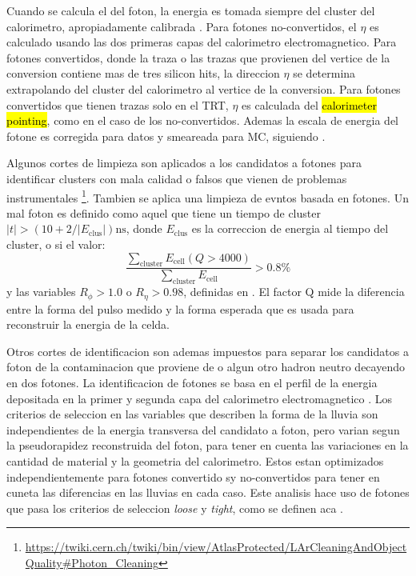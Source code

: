 Cuando se calcula el {\pt} del foton, la energia es tomada siempre del cluster
del calorimetro, apropiadamente calibrada \cite{Banfi:1259219}.
Para fotones no-convertidos, el $\eta$ es calculado usando las dos primeras
capas del calorimetro electromagnetico. Para fotones convertidos, donde la traza
o las trazas que provienen del vertice de la conversion contiene mas de tres
silicon hits, la direccion $\eta$ se determina extrapolando del cluster del
calorimetro al vertice de la conversion.
Para fotones convertidos que tienen trazas solo en el TRT, $\eta$ es calculada
del \hl{calorimeter pointing}, como en el caso de los no-convertidos. Ademas
la escala de energia del fotone es corregida para datos y smeareada para MC,
siguiendo \cite{EGScaleTwiki}.

Algunos cortes de limpieza son aplicados a los candidatos a fotones para
identificar clusters con mala calidad o falsos que vienen de problemas
instrumentales \footnote{\url{https://twiki.cern.ch/twiki/bin/view/AtlasProtected/LArCleaningAndObjectQuality\#Photon_Cleaning}}.
Tambien se aplica una limpieza de evntos basada en fotones. Un mal foton
es definido como aquel que tiene un tiempo de cluster $|t|>(10+2/|E_\text{clus}|) \text{ns}$,
donde $E_\text{clus}$ es la correccion de energia al tiempo del cluster,
o si el valor:
\begin{equation}
  \frac{\sum_\text{cluster} E_\text{cell}(Q>4000)}{\sum_\text{cluster} E_\text{cell} } > 0.8\%
\end{equation}
%
y las variables $R_\phi > 1.0$ o $R_\eta > 0.98$, definidas
en \cite{PhotonCleaning}. El factor Q mide la diferencia entre la forma
del pulso medido y la forma esperada que es usada para reconstruir
la energia de la celda.

Otros cortes de identificacion son ademas impuestos para separar los
candidatos a foton de la contaminacion que proviene de {\pizero} o
algun otro hadron neutro decayendo en dos fotones. La identificacion
de fotones se basa en el perfil de la energia depositada en la primer
y segunda capa del calorimetro electromagnetico \cite{ATL-PHYS-PUB-2011-007}.
Los criterios de seleccion en las variables que describen la forma de
la lluvia son independientes de la energia transversa del candidato a
foton, pero varian segun la pseudorapidez reconstruida del foton, para
tener en cuenta las variaciones en la cantidad de material y la geometria
del calorimetro. Estos estan optimizados independientemente para fotones
convertido sy no-convertidos para tener en cuneta las diferencias en las
lluvias en cada caso. Este analisis hace uso de fotones que pasa los
criterios de seleccion \emph{loose} y \emph{tight}, como se definen aca
\cite{ATL-PHYS-PUB-2011-007}.

